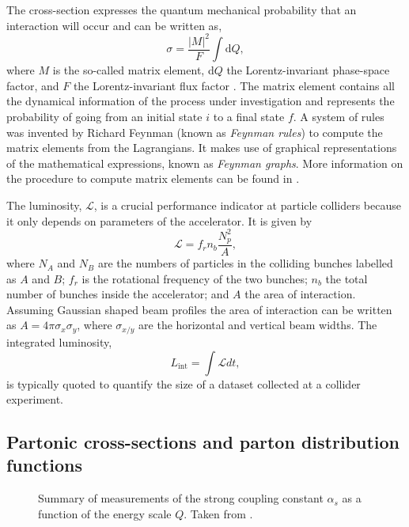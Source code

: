 The cross-section expresses the quantum mechanical probability that an interaction will occur and can be written as,
\begin{equation}
  \sigma = \frac{|M|^2}{F} \int \text{d}Q,
\end{equation}
where $M$ is the so-called matrix element, d$Q$ the Lorentz-invariant phase-space factor, and $F$ the Lorentz-invariant flux factor \cite{Halzen:1984mc}. 
The matrix element contains all the dynamical information of the process under investigation and represents the probability of going from an initial state $i$ to a final state $f$. 
A system of rules was invented by Richard Feynman (known as \emph{Feynman rules}) to compute the matrix elements from the Lagrangians. It makes use of graphical representations of the mathematical expressions, known as \emph{Feynman graphs}. More information on the procedure to compute matrix elements can be found in .

The luminosity, $\mathcal{L}$, is a crucial performance indicator at particle colliders because it only depends on parameters of the accelerator.
It is given by
\begin{equation}
  \mathcal{L} = f_rn_b\frac{N_p^2}{A},
\end{equation}
where $N_A$ and $N_B$ are the numbers of particles in the colliding bunches labelled as $A$ and $B$; $f_r$ is the rotational frequency of the two bunches; $n_b$ the total number of bunches inside the accelerator; and $A$ the area of interaction. Assuming Gaussian shaped beam profiles the area of interaction can be written as $A = 4\pi \sigma_x \sigma_y$, where $\sigma_{x/y}$ are the horizontal and vertical beam widths.
The integrated luminosity, 
\begin{equation}
  L_\text{int} = \int \mathcal{L} dt,
\end{equation}
is typically quoted to quantify the size of a dataset collected at a collider experiment.


\subsection{Partonic cross-sections and parton distribution functions}


\begin{figure}
  \caption[Summary of measurements of the strong coupling constant $\alpha_s$ as a function of the energy scale $Q$.]{Summary of measurements of the strong coupling constant $\alpha_s$ as a function of the energy scale $Q$. Taken from . }
  \label{fig:pdfs}
\end{figure}


